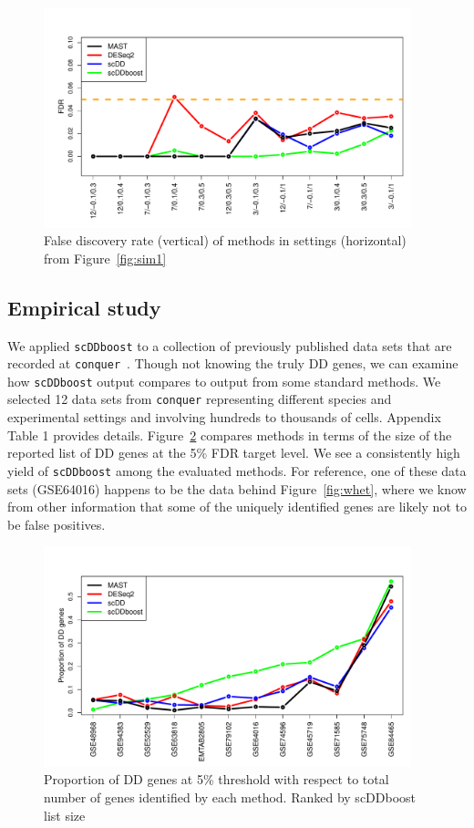\documentclass[aoas,preprint]{imsart}
\begin{document}
\begin{figure}[H]
  \includegraphics[width = 0.95\textwidth]{Figs/simuFDR.pdf}
  \caption{False discovery rate (vertical) of methods in settings (horizontal) from Figure~\ref{fig:sim1} }
  \label{fig:sim2}
\end{figure}


\subsection{Empirical study}

We applied \verb+scDDboost+ to a collection of previously published
data sets that are recorded at \verb+conquer+~\citep{ref:Cq}.  Though not knowing the truly DD
genes, we can examine how \verb+scDDboost+ output compares to output from some standard methods.  We selected
12 data sets from \verb+conquer+   representing different species and experimental settings
and involving hundreds to thousands of cells.   Appendix Table 1 provides details.  Figure~\ref{fig:es} compares
methods in terms of the size of the reported list of DD genes at the 5\% FDR target level.  
We see a consistently high yield of \verb+scDDboost+ among the evaluated  methods.  For reference, one of these data 
sets (GSE64016) happens to be the data behind Figure~\ref{fig:whet}, where we know from other information that some
of the uniquely identified genes are likely not to be false positives.


\begin{figure}[H]
\includegraphics[width = 0.95\textwidth]{Figs/DD95.pdf}
 \caption{Proportion of DD genes at 5\% threshold with respect to total number of genes identified by each method. Ranked by 
 scDDboost list size }
  \label{fig:es}
\end{figure}
\end{document}
